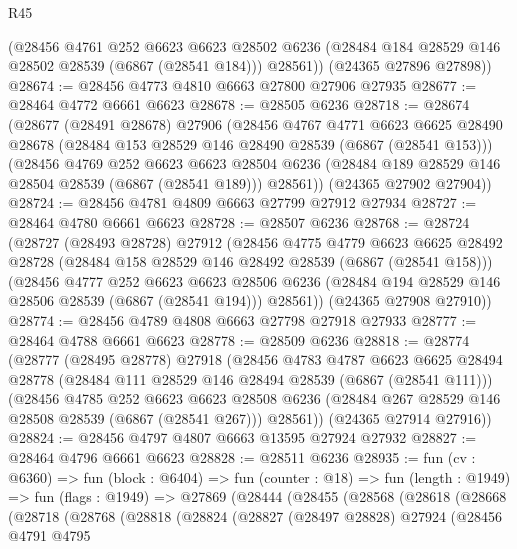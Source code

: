 \begin{lexlean}{R45}
\begin{coremodule}
{        (@28456
          @4761
          @252
          @6623
          @6623
          @28502
          @6236
          (@28484 @184 @28529 @146 @28502 @28539 (@6867 (@28541 @184)))
          @28561))
      (@24365 @27896 @27898))
@28674 := @28456 @4773 @4810 @6663 @27800 @27906 @27935
@28677 := @28464 @4772 @6661 @6623
@28678 := @28505 @6236
@28718 := @28674
    (@28677
      (@28491 @28678)
      @27906
      (@28456
        @4767
        @4771
        @6623
        @6625
        @28490
        @28678
        (@28484 @153 @28529 @146 @28490 @28539 (@6867 (@28541 @153)))
        (@28456
          @4769
          @252
          @6623
          @6623
          @28504
          @6236
          (@28484 @189 @28529 @146 @28504 @28539 (@6867 (@28541 @189)))
          @28561))
      (@24365 @27902 @27904))
@28724 := @28456 @4781 @4809 @6663 @27799 @27912 @27934
@28727 := @28464 @4780 @6661 @6623
@28728 := @28507 @6236
@28768 := @28724
    (@28727
      (@28493 @28728)
      @27912
      (@28456
        @4775
        @4779
        @6623
        @6625
        @28492
        @28728
        (@28484 @158 @28529 @146 @28492 @28539 (@6867 (@28541 @158)))
        (@28456
          @4777
          @252
          @6623
          @6623
          @28506
          @6236
          (@28484 @194 @28529 @146 @28506 @28539 (@6867 (@28541 @194)))
          @28561))
      (@24365 @27908 @27910))
@28774 := @28456 @4789 @4808 @6663 @27798 @27918 @27933
@28777 := @28464 @4788 @6661 @6623
@28778 := @28509 @6236
@28818 := @28774
    (@28777
      (@28495 @28778)
      @27918
      (@28456
        @4783
        @4787
        @6623
        @6625
        @28494
        @28778
        (@28484 @111 @28529 @146 @28494 @28539 (@6867 (@28541 @111)))
        (@28456
          @4785
          @252
          @6623
          @6623
          @28508
          @6236
          (@28484 @267 @28529 @146 @28508 @28539 (@6867 (@28541 @267)))
          @28561))
      (@24365 @27914 @27916))
@28824 := @28456 @4797 @4807 @6663 @13595 @27924 @27932
@28827 := @28464 @4796 @6661 @6623
@28828 := @28511 @6236
@28935 := fun (cv : @6360) =>
  fun (block : @6404) =>
  fun (counter : @18) =>
  fun (length : @1949) =>
  fun (flags : @1949) =>
  @27869
    (@28444
      (@28455
        (@28568
          (@28618
            (@28668
              (@28718
                (@28768
                  (@28818
                    (@28824
                      (@28827
                        (@28497 @28828)
                        @27924
                        (@28456
                          @4791
                          @4795
}
\end{coremodule}
\end{lexlean}
